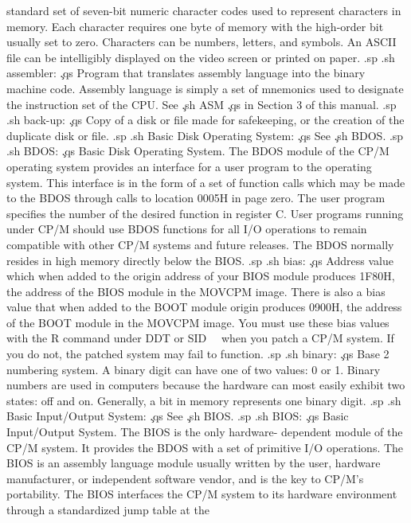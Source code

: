 standard set of seven-bit numeric character codes used to 
represent characters in memory.  Each character requires one byte 
of memory with the high-order bit usually set to zero.  
Characters can be numbers, letters, and symbols.  An ASCII file can be 
intelligibly displayed on the video screen or printed on paper.
.sp
.sh
assembler:  \c
.qs
Program that translates assembly language into the binary machine 
code.  Assembly language is simply a set of mnemonics used to 
designate the instruction set of the CPU.  See \c
.sh
ASM \c
.qs
in Section 3 of this manual.
.sp
.sh
back-up:  \c
.qs
Copy of a disk or file made for safekeeping, or the creation of 
the duplicate disk or file.
.sp
.sh
Basic Disk Operating System:  \c
.qs
See \c
.sh
BDOS.
.sp
.sh
BDOS:  \c
.qs
Basic Disk Operating System.  The BDOS module of the CP/M 
operating system provides an interface for a user program to the 
operating system.  This interface is in the form of a set of 
function calls which may be made to the BDOS through calls to 
location 0005H in page zero.  The user program specifies the 
number of the desired function in register C.  User programs 
running under CP/M should use BDOS functions for all I/O 
operations to remain compatible with other CP/M systems and 
future releases.  The BDOS normally resides in high memory 
directly below the BIOS.
.sp
.sh
bias:  \c
.qs
Address value which when added to the origin address of your BIOS 
module produces 1F80H, the address of the BIOS module in the 
MOVCPM image.  There is also a bias value that when added to the 
BOOT module origin produces 0900H, the address of the BOOT module 
in the MOVCPM image.  You must use these bias values with the R 
command under DDT or SID \ \ when you patch a CP/M system.  If you do 
not, the patched system may fail to function.
.sp
.sh
binary:  \c
.qs
Base 2 numbering system.  A binary digit can have one of two 
values:  0 or 1.  Binary numbers are used in computers because 
the hardware can most easily exhibit two states:  off and on. 
Generally, a bit in memory represents one binary digit.
.sp
.sh
Basic Input/Output System:  \c
.qs
See \c
.sh
BIOS.
.sp
.sh
BIOS:  \c
.qs
Basic Input/Output System.  The BIOS is the only hardware-
dependent module of the CP/M system.  It provides the BDOS with a 
set of primitive I/O operations.  The BIOS is an assembly 
language module usually written by the user, hardware 
manufacturer, or independent software vendor, and is the key to 
CP/M's portability.  The BIOS interfaces the CP/M system to its 
hardware environment through a standardized jump table at the 
